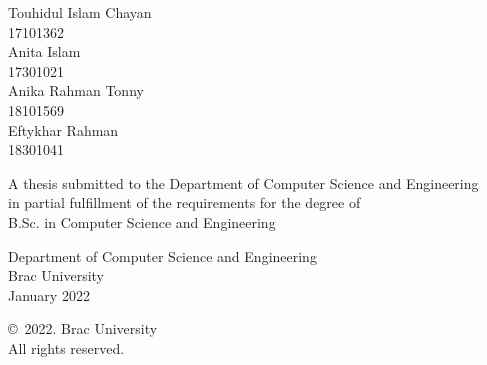 \begin{titlepage}
\renewcommand*{\thepage}{Title} %

    \begin{center} 
        \vspace*{3cm} %
        
        {\fontsize{16pt}{22pt}\selectfont{Decipherable Classification of Glaucoma using\\
        Deep Neural Network Leveraging XAI}
        } %
        
        \vspace{1.5cm}
        
        
        \vspace{0.5cm}
        
        	Touhidul Islam Chayan\\
	        17101362\\
	        Anita Islam\\
	        17301021\\
	        Anika Rahman Tonny\\
	        18101569\\
	        Eftykhar Rahman\\
	        18301041

        \vspace{1.5cm}
        
        	A thesis submitted to the Department of Computer Science and Engineering\\
            in partial fulfillment of the requirements for the degree of\\
            B.Sc. in Computer Science and Engineering

        
        \vspace{2.5cm}
        
    		Department of Computer Science and Engineering\\
            Brac University\\
            January 2022
        
        \vspace{3cm}
        
    		\copyright\ 2022. Brac University\\
            All rights reserved.
    
    \end{center}

\end{titlepage}